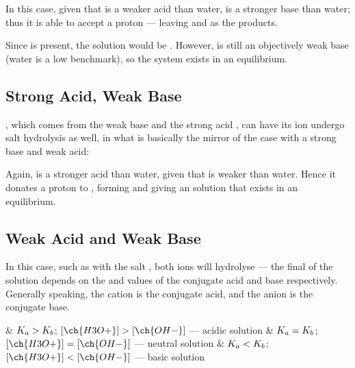 			In this case, given that  is a weaker acid than water,  is a stronger base than water; thus it is
			able to accept a proton --- leaving  and  as the products.

			Since  is present, the solution would be . However,  is still an objectively weak base
			(water is a low benchmark), so the system exists in an equilibrium.



		\subsection{Strong Acid, Weak Base}
			, which comes from the weak base  and the strong acid , can have its  ion undergo
			salt hydrolysis as well, in what is basically the mirror of the case with a strong base and weak acid:


			Again,  is a stronger acid than water, given that  is weaker than water. Hence it donates a proton to ,
			forming  and giving an  solution that exists in an equilibrium.



		\pagebreak
		\subsection{Weak Acid and Weak Base}

			In this case, such as with the salt , both ions will hydrolyse --- the final \pH{} of the solution depends on
			the \Ka{} and \Kb{} values of the conjugate acid and base respectively. Generally speaking, the cation is the conjugate acid,
			and the anion is the conjugate base.

			\begin{bulletlist}
				& $K_{a} > K_{b}$;\hspace{4mm} $[\ch{H3O+}] > [\ch{OH-}]$ \hspace{3mm} --- \hspace{3mm} acidic solution
				& $K_{a} = K_{b}$;\hspace{4mm} $[\ch{H3O+}] = [\ch{OH-}]$ \hspace{3mm} --- \hspace{3mm} neutral solution
				& $K_{a} < K_{b}$;\hspace{4mm} $[\ch{H3O+}] < [\ch{OH-}]$ \hspace{3mm} --- \hspace{3mm} basic solution
			\end{bulletlist}


